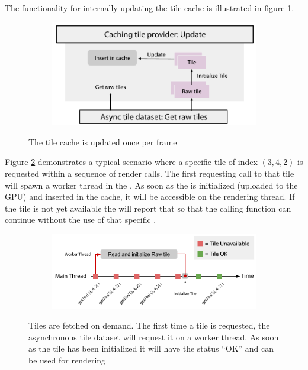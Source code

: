 The functionality for internally updating the tile cache is illustrated in figure \ref{fig:cachingtileprovider_update}.

\begin{figure}[!h]
    \centering
    \begin{subfigure}[bt]{0.6\textwidth}
        \includegraphics[width=\textwidth]{figures/implementation/tileprovider/cachingtileprovider_update.pdf}
    \end{subfigure}
    \caption{The tile cache is updated once per frame}
    \label{fig:cachingtileprovider_update}
\end{figure}

\FloatBarrier

Figure \ref{fig:cachingtileprovider_tilerequest} demonstrates a typical scenario where a specific tile of index $(3, 4, 2)$ is requested within a sequence of render calls. The first requesting call to that tile will spawn a worker thread in the . As soon as the  is initialized (uploaded to the GPU) and inserted in the cache, it will be accessible on the rendering thread. If the tile is not yet available the  will report that so that the calling function can continue without the use of that specific .

\begin{figure}[!h]
    \centering
    \begin{subfigure}[bt]{0.95\textwidth}
        \includegraphics[width=\textwidth]{figures/implementation/tileprovider/cachingtileprovider_tilerequest.pdf}
    \end{subfigure}
    \caption{Tiles are fetched on demand. The first time a tile is requested, the asynchronous tile dataset will request it on a worker thread. As soon as the tile has been initialized it will have the status ``OK'' and can be used for rendering}
    \label{fig:cachingtileprovider_tilerequest}
\end{figure}

